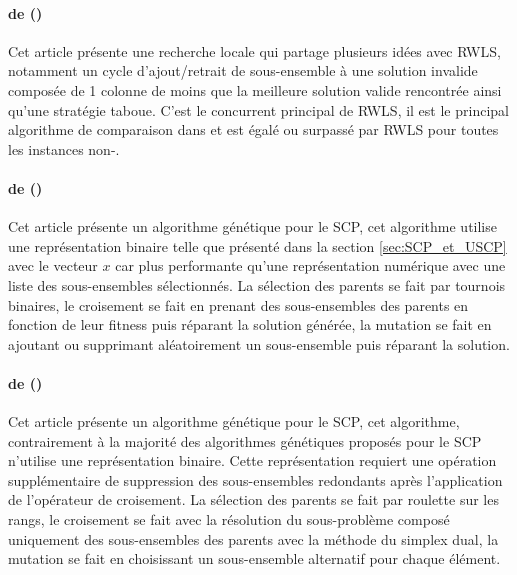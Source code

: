\documentclass[a4paper,11pt,twoside,french,report]{../common/simplem}
\begin{document}
				\paragraph*{ de \citeauthor{Musliu2006} (\citeyear{Musliu2006})~\cite{Musliu2006}\\}
					Cet article présente une recherche locale qui partage plusieurs idées avec \gls{RWLS}, notamment un cycle d'ajout/retrait de sous-ensemble à une solution invalide composée de 1 colonne de moins que la meilleure solution valide rencontrée ainsi qu'une stratégie taboue. C'est le concurrent principal de \gls{RWLS}, il est le principal algorithme de comparaison dans \cite{Gao2015} et est égalé ou surpassé par \gls{RWLS} pour toutes les instances non-.
				\paragraph*{ de \citeauthor{Beasley1996} (\citeyear{Beasley1996})~\cite{Beasley1996}\\}
					Cet article présente un algorithme génétique pour le \gls{SCP}, cet algorithme utilise une représentation binaire telle que présenté dans la section \ref{sec:SCP_et_USCP} avec le vecteur \(x\) car plus performante qu'une représentation numérique avec une liste des sous-ensembles sélectionnés. La sélection des parents se fait par tournois binaires, le croisement se fait en prenant des sous-ensembles des parents en fonction de leur fitness puis réparant la solution générée, la mutation se fait en ajoutant ou supprimant aléatoirement un sous-ensemble puis réparant la solution.
				\paragraph*{ de \citeauthor{Eremeev1999} (\citeyear{Eremeev1999})~\cite{Eremeev1999}\\}
					Cet article présente un algorithme génétique pour le \gls{SCP}, cet algorithme, contrairement à la majorité des algorithmes génétiques proposés pour le \gls{SCP} n'utilise une représentation binaire. Cette représentation requiert une opération supplémentaire de suppression des sous-ensembles redondants après l'application de l'opérateur de croisement. La sélection des parents se fait par roulette sur les rangs, le croisement se fait avec la résolution du sous-problème composé uniquement des sous-ensembles des parents avec la méthode du simplex dual, la mutation se fait en choisissant un sous-ensemble alternatif pour chaque élément.
\end{document}
